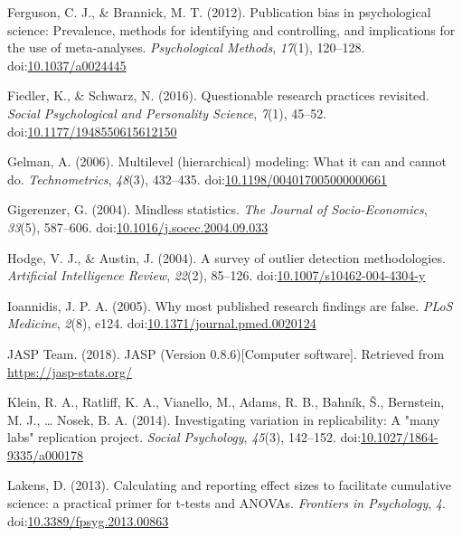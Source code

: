 \documentclass[english,,man]{apa6}
\begin{document}
\leavevmode\hypertarget{ref-Ferguson2012a}{}%
Ferguson, C. J., \& Brannick, M. T. (2012). Publication bias in psychological science: Prevalence, methods for identifying and controlling, and implications for the use of meta-analyses. \emph{Psychological Methods}, \emph{17}(1), 120--128. doi:\href{https://doi.org/10.1037/a0024445}{10.1037/a0024445}

\leavevmode\hypertarget{ref-Fiedler2016}{}%
Fiedler, K., \& Schwarz, N. (2016). Questionable research practices revisited. \emph{Social Psychological and Personality Science}, \emph{7}(1), 45--52. doi:\href{https://doi.org/10.1177/1948550615612150}{10.1177/1948550615612150}

\leavevmode\hypertarget{ref-Gelman2006}{}%
Gelman, A. (2006). Multilevel (hierarchical) modeling: What it can and cannot do. \emph{Technometrics}, \emph{48}(3), 432--435. doi:\href{https://doi.org/10.1198/004017005000000661}{10.1198/004017005000000661}

\leavevmode\hypertarget{ref-Gigerenzer2004}{}%
Gigerenzer, G. (2004). Mindless statistics. \emph{The Journal of Socio-Economics}, \emph{33}(5), 587--606. doi:\href{https://doi.org/10.1016/j.socec.2004.09.033}{10.1016/j.socec.2004.09.033}

\leavevmode\hypertarget{ref-Hodge2004}{}%
Hodge, V. J., \& Austin, J. (2004). A survey of outlier detection methodologies. \emph{Artificial Intelligence Review}, \emph{22}(2), 85--126. doi:\href{https://doi.org/10.1007/s10462-004-4304-y}{10.1007/s10462-004-4304-y}

\leavevmode\hypertarget{ref-Ioannidis2005}{}%
Ioannidis, J. P. A. (2005). Why most published research findings are false. \emph{PLoS Medicine}, \emph{2}(8), e124. doi:\href{https://doi.org/10.1371/journal.pmed.0020124}{10.1371/journal.pmed.0020124}

\leavevmode\hypertarget{ref-JASP2018}{}%
JASP Team. (2018). JASP (Version 0.8.6){[}Computer software{]}. Retrieved from \url{https://jasp-stats.org/}

\leavevmode\hypertarget{ref-Klein2014c}{}%
Klein, R. A., Ratliff, K. A., Vianello, M., Adams, R. B., Bahník, Š., Bernstein, M. J., \ldots{} Nosek, B. A. (2014). Investigating variation in replicability: A "many labs" replication project. \emph{Social Psychology}, \emph{45}(3), 142--152. doi:\href{https://doi.org/10.1027/1864-9335/a000178}{10.1027/1864-9335/a000178}

\leavevmode\hypertarget{ref-Lakens2013}{}%
Lakens, D. (2013). Calculating and reporting effect sizes to facilitate cumulative science: a practical primer for t-tests and ANOVAs. \emph{Frontiers in Psychology}, \emph{4}. doi:\href{https://doi.org/10.3389/fpsyg.2013.00863}{10.3389/fpsyg.2013.00863}
\end{document}
